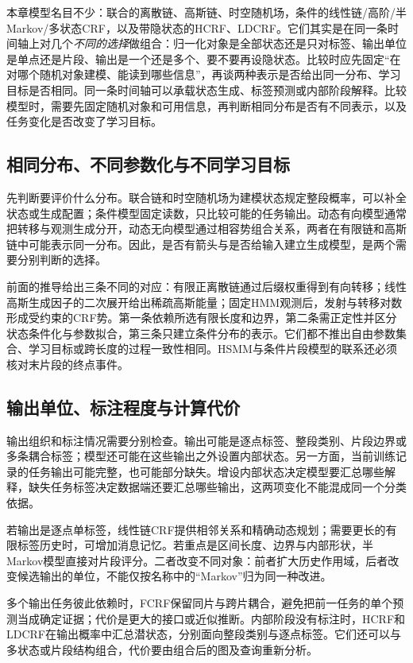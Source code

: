 本章模型名目不少：联合的离散链、高斯链、时空随机场，条件的线性链/高阶/半Markov/多状态CRF，以及带隐状态的HCRF、LDCRF。它们其实是在同一条时间轴上对几个\emph{不同的选择}做组合：归一化对象是全部状态还是只对标签、输出单位是单点还是片段、输出是一个还是多个、要不要再设隐状态。比较时应先固定“在对哪个随机对象建模、能读到哪些信息”，再谈两种表示是否给出同一分布、学习目标是否相同。同一条时间轴可以承载状态生成、标签预测或内部阶段解释。比较模型时，需要先固定随机对象和可用信息，再判断相同分布是否有不同表示，以及任务变化是否改变了学习目标。

\subsection{相同分布、不同参数化与不同学习目标}
\label{sec:pgm-dynamic-undirected-relations}

先判断要评价什么分布。联合链和时空随机场为建模状态规定整段概率，可以补全状态或生成配置；条件模型固定读数，只比较可能的任务输出。动态有向模型通常把转移与观测生成分开，动态无向模型通过相容势组合关系，两者在有限链和高斯链中可能表示同一分布。因此，是否有箭头与是否给输入建立生成模型，是两个需要分别判断的选择。

前面的推导给出三条不同的对应：有限正离散链通过后缀权重得到有向转移；线性高斯生成因子的二次展开给出稀疏高斯能量；固定HMM观测后，发射与转移对数形成受约束的CRF势。第一条依赖所选有限长度和边界，第二条需正定性并区分状态条件化与参数拟合，第三条只建立条件分布的表示。它们都不推出自由参数集合、学习目标或跨长度的过程一致性相同。HSMM与条件片段模型的联系还必须核对末片段的终点事件。

\subsection{输出单位、标注程度与计算代价}
\label{sec:pgm-dynamic-undirected-evaluation}

输出组织和标注情况需要分别检查。输出可能是逐点标签、整段类别、片段边界或多条耦合标签；模型还可能在这些输出之外设置内部状态。另一方面，当前训练记录的任务输出可能完整，也可能部分缺失。增设内部状态决定模型要汇总哪些解释，缺失任务标签决定数据端还要汇总哪些输出，这两项变化不能混成同一个分类依据。

若输出是逐点单标签，线性链CRF提供相邻关系和精确动态规划；需要更长的有限标签历史时，可增加消息记忆。若重点是区间长度、边界与内部形状，半Markov模型直接对片段评分。二者改变不同对象：前者扩大历史作用域，后者改变候选输出的单位，不能仅按名称中的“Markov”归为同一种改进。

多个输出任务彼此依赖时，FCRF保留同片与跨片耦合，避免把前一任务的单个预测当成确定证据；代价是更大的接口或近似推断。内部阶段没有标注时，HCRF和LDCRF在输出概率中汇总潜状态，分别面向整段类别与逐点标签。它们还可以与多状态或片段结构组合，代价要由组合后的图及查询重新分析。

